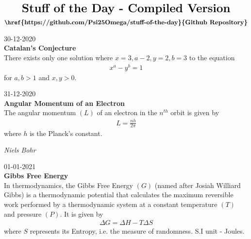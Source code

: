 \documentclass{article}
\begin{document}
\begin{align*}
    \LARGE\textbf{Stuff of the Day - Compiled Version}
\end{align*}
\begin{align*}
\textbf{\href{https://github.com/Psi25Omega/stuff-of-the-day}{Github Repository}}
\end{align*}
\begin{tcolorbox}[width=5in,sharp corners]
30-12-2020\\ \textbf{Catalan's Conjecture}\\ There exists only one solution where $x=3, a-2, y=2, b=3$ to the equation \begin{align*} x^a - y^b = 1 \end{align*} for $a,b > 1$ and $x,y > 0$.
\end{tcolorbox}
\begin{tcolorbox}[width=5in,sharp corners]
31-12-2020\\ \textbf{Angular Momentum of an Electron}\\ The angular momentum $(L)$ of an electron in the $n^{th}$ orbit is given by \begin{align*} L = \frac{nh}{2\pi} \end{align*} where $h$ is the Planck's constant. \begin{flushright} \textit{Niels Bohr} \end{flushright}
\end{tcolorbox}
\begin{tcolorbox}[width=5in,sharp corners]
01-01-2021\\ \textbf{Gibbs Free Energy}\\ In thermodynamics, the Gibbs Free Energy $(G)$ (named after Josiah Williard Gibbs) is a thermodynamic potential that calculates the maximum reversible work  performed by a thermodynamic system at a constant temperature $(T)$ and pressure $(P)$. It is given by \begin{align*} \Delta G=\Delta H-T\Delta S \end{align*} where $S$ represents its Entropy, i.e. the measure of randomness. S.I unit - Joules.
\end{tcolorbox}
\end{document}
